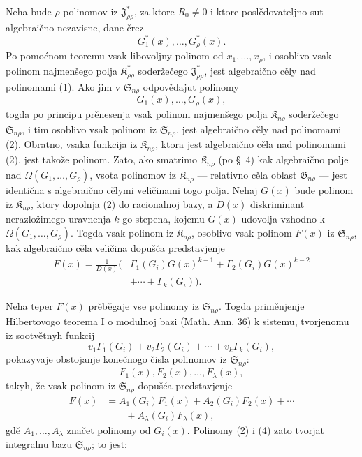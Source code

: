 \documentclass[11pt]{article}
\providecommand{\Kfield}{\mathfrak{K}}
\providecommand{\Ssys}{\mathfrak{S}}
\providecommand{\Jdom}{\mathfrak{J}}
\providecommand{\Gdom}{\mathfrak{G}}
\begin{document}
Neha bude $\rho$ polinomov iz $\Jdom^*_{\rho\rho}$, za ktore $R_0\ne0$ i ktore poslědovateljno sut algebraično nezavisne, dane črez
\begin{equation}
  G_1^*(x),\ldots,G_\rho^*(x).
\tag{1}
\end{equation}
Po pomoćnom teoremu vsak libovoljny polinom od $x_1,\ldots,x_\rho$, i osoblivo vsak polinom najmenšego polja $\Kfield^*_{\rho\rho}$ soderžečego $\Jdom^*_{\rho\rho}$, jest algebraično cěly nad polinomami (1). Ako jim v $\Ssys_{n\rho}$ odpovědajut polinomy
\begin{equation}
  G_1(x),\ldots,G_\rho(x),
\tag{2}
\end{equation}
togda po principu prěnesenja vsak polinom najmenšego polja $\Kfield_{n\rho}$ soderžečego $\Ssys_{n\rho}$, i tim osoblivo vsak polinom iz $\Ssys_{n\rho}$, jest algebraično cěly nad polinomami (2). Obratno, vsaka funkcija iz $\Kfield_{n\rho}$, ktora jest algebraično cěla nad polinomami (2), jest takože polinom. Zato, ako smatrimo $\Kfield_{n\rho}$ (po \S\ 4) kak algebraično polje nad $\Omega(G_1,\ldots,G_\rho)$, vsota polinomov iz $\Kfield_{n\rho}$ --- relativno cěla oblast $\Gdom_{n\rho}$ --- jest identična s algebraično cělymi veličinami togo polja. Nehaj $G(x)$ bude polinom iz $\Kfield_{n\rho}$, ktory dopolnja (2) do racionalnoj bazy, a $D(x)$ diskriminant nerazložimego uravnenja $k$-go stepena, kojemu $G(x)$ udovolja vzhodno k $\Omega(G_1,\ldots,G_\rho)$. Togda vsak polinom iz $\Kfield_{n\rho}$, osoblivo vsak polinom $F(x)$ iz $\Ssys_{n\rho}$, kak algebraično cěla veličina dopušća predstavjenje
\begin{equation}
\begin{split}
  F(x)=\frac{1}{D(x)}\big(&\Gamma_1(G_i)G(x)^{k-1}
    +\Gamma_2(G_i)G(x)^{k-2}\\
    &+\cdots+\Gamma_k(G_i)\big).
\end{split}
\tag{3}
\end{equation}

Neha teper $F(x)$ prěběgaje vse polinomy iz $\Ssys_{n\rho}$. Togda priměnjenje Hilbertovogo teorema I o modulnoj bazi (Math. Ann. 36) k sistemu, tvorjenomu iz sootvětnyh funkcij
\[
  v_1\Gamma_1(G_i)+v_2\Gamma_2(G_i)+\cdots+v_k\Gamma_k(G_i),
\]
pokazyvaje obstojanje konečnogo čisla polinomov iz $\Ssys_{n\rho}$:
\begin{equation}
  F_1(x),F_2(x),\ldots,F_\lambda(x),
\tag{4}
\end{equation}
takyh, že vsak polinom iz $\Ssys_{n\rho}$ dopušća predstavjenje
\begin{equation}
\begin{aligned}
  F(x)&=A_1(G_i)F_1(x)+A_2(G_i)F_2(x)+\cdots\\
      &\qquad +A_\lambda(G_i)F_\lambda(x),
\end{aligned}
\tag{5}
\end{equation}
gdě $A_1,\ldots,A_\lambda$ značet polinomy od $G_i(x)$. Polinomy (2) i (4) zato tvorjat integralnu bazu $\Ssys_{n\rho}$; to jest:
\end{document}
